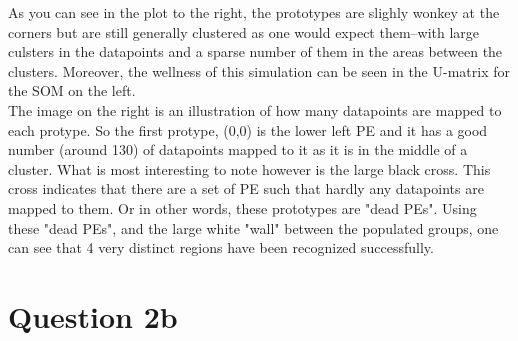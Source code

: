 \documentclass[epsfig]{article}
\begin{document}
\newline
As you can see in the plot to the right, the prototypes are slighly wonkey at the corners but are still generally clustered as one would expect them--with large culsters in the datapoints and a sparse number of them in the areas between the clusters. Moreover, the wellness of this simulation can be seen in the U-matrix for the SOM on the left.\\
\newline
The image on the right is an illustration of how many datapoints are mapped to each protype. So the first protype, (0,0) is the lower left PE and it has a good number (around 130) of datapoints mapped to it as it is in the middle of a cluster. What is most interesting to note however is the large black cross. This cross indicates that there are a set of PE such that hardly any datapoints are mapped to them. Or in other words, these prototypes are "dead PEs". Using these "dead PEs", and the large white "wall" between the populated groups, one can see that 4 very distinct regions have been recognized successfully.\\
\newpage
\section*{Question 2b}
 \begin{table}[htbp] 
\center
\caption{Parameters for Question 2a}
  \label{tab:NP}
\end{table}
\end{document}
